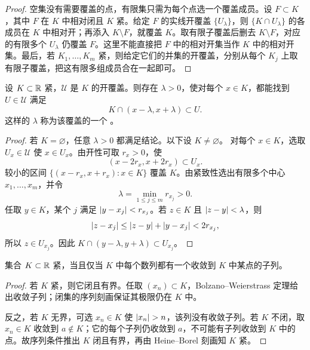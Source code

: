 \begin{proof}
空集没有需要覆盖的点，有限集只需为每个点选一个覆盖成员。设 \(F\subset K\)，其中 \(F\) 在 \(K\) 中相对闭且 \(K\) 紧。给定 \(F\) 的实线开覆盖 \(\{U_\lambda\}\)，则 \(\{K\cap U_\lambda\}\) 的各成员在 \(K\) 中相对开；再添入 \(K\setminus F\)，就覆盖 \(K\)。取有限子覆盖后删去 \(K\setminus F\)，对应的有限多个 \(U_\lambda\) 仍覆盖 \(F\)。这里不能直接把 \(F\) 中的相对开集当作 \(K\) 中的相对开集。最后，若 \(K_1,\ldots,K_m\) 紧，则给定它们的并集的开覆盖，分别从每个 \(K_j\) 上取有限子覆盖，把这有限多组成员合在一起即可。
\end{proof}

\begin{theorem}
设 \(K\subset\mathbb{R}\) 紧，\(\mathcal U\) 是 \(K\) 的开覆盖。则存在 \(\lambda>0\)，使对每个 \(x\in K\)，都能找到 \(U\in\mathcal U\) 满足
\[
 K\cap(x-\lambda,x+\lambda)\subset U.
\]
这样的 \(\lambda\) 称为该覆盖的一个 。
\end{theorem}

\begin{proof}
若 \(K=\varnothing\)，任意 \(\lambda>0\) 都满足结论。以下设 \(K\ne\varnothing\)。
对每个 \(x\in K\)，选取 \(U_x\in\mathcal U\) 使 \(x\in U_x\)。由开性可取 \(r_x>0\)，使
\[
 (x-2r_x,x+2r_x)\subset U_x.
\]
较小的区间 \(\{(x-r_x,x+r_x):x\in K\}\) 覆盖 \(K\)。由紧致性选出有限多个中心
\(x_1,\ldots,x_m\)，并令
\[
 \lambda=\min_{1\le j\le m}r_{x_j}>0.
\]
任取 \(y\in K\)，某个 \(j\) 满足 \(\left|y-x_j\right|<r_{x_j}\)。若 \(z\in K\) 且 \(\left|z-y\right|<\lambda\)，则
\[
 \left|z-x_j\right|\le\left|z-y\right|+\left|y-x_j\right|<2r_{x_j},
\]
所以 \(z\in U_{x_j}\)。因此 \(K\cap(y-\lambda,y+\lambda)\subset U_{x_j}\)。
\end{proof}

\begin{corollary}[实线上的序列紧致性]
集合 \(K\subset\mathbb{R}\) 紧，当且仅当 \(K\) 中每个数列都有一个收敛到 \(K\) 中某点的子列。
\end{corollary}

\begin{proof}
若 \(K\) 紧，则它闭且有界。任取 \((x_n)\subset K\)，Bolzano--Weierstrass 定理给出收敛子列；闭集的序列刻画保证其极限仍在 \(K\) 中。

反之，若 \(K\) 无界，可选 \(x_n\in K\) 使 \(\abs{x_n}>n\)，该列没有收敛子列。若 \(K\) 不闭，取 \(x_n\in K\) 收敛到 \(a\notin K\)；它的每个子列仍收敛到 \(a\)，不可能有子列收敛到 \(K\) 中的点。故序列条件推出 \(K\) 闭且有界，再由 Heine--Borel 刻画知 \(K\) 紧。
\end{proof}

